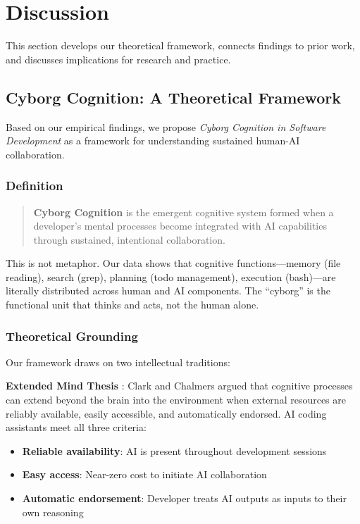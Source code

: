 
\section{Discussion}

This section develops our theoretical framework, connects findings to prior work, and discusses implications for research and practice.

\subsection{Cyborg Cognition: A Theoretical Framework}

Based on our empirical findings, we propose \textit{Cyborg Cognition in Software Development} as a framework for understanding sustained human-AI collaboration.

\subsubsection{Definition}

\begin{quote}
\textbf{Cyborg Cognition} is the emergent cognitive system formed when a developer's mental processes become integrated with AI capabilities through sustained, intentional collaboration.
\end{quote}

This is not metaphor. Our data shows that cognitive functions---memory (file reading), search (grep), planning (todo management), execution (bash)---are literally distributed across human and AI components. The ``cyborg'' is the functional unit that thinks and acts, not the human alone.

\subsubsection{Theoretical Grounding}

Our framework draws on two intellectual traditions:

\textbf{Extended Mind Thesis} \cite{clark1998extended}: Clark and Chalmers argued that cognitive processes can extend beyond the brain into the environment when external resources are reliably available, easily accessible, and automatically endorsed. AI coding assistants meet all three criteria:
\begin{itemize}
    \item \textbf{Reliable availability}: AI is present throughout development sessions
    \item \textbf{Easy access}: Near-zero cost to initiate AI collaboration
    \item \textbf{Automatic endorsement}: Developer treats AI outputs as inputs to their own reasoning
\end{itemize}

